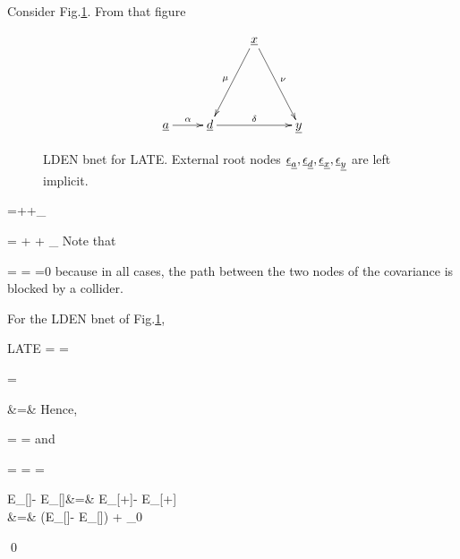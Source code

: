  Consider Fig.\ref{fig-late-lden}.
 From that figure

\begin{figure}[h!]
$$
\xymatrix{
&&\rvx\ar[ddl]_\mu
\ar[ddr]^\nu
\\
\\
\rva\ar[r]^\alp
&\rvd\ar[rr]^\delta
&&\rvy
}
$$
\caption{
LDEN bnet for LATE.
External root nodes 
$\underline{\epsilon}_{\underline{a}}, \underline{\epsilon}_{\underline{d}},
\underline{\epsilon}_{\underline{x}}, \underline{\epsilon}_{\underline{y}}$ are left implicit.}
\label{fig-late-lden}
\end{figure}

\beq
\rvd=\alp\rva +\mu\rvx +\rveps_\rvd
\eeq

\beq
\rvy = \delta \rvd + \nu\rvx + \rveps_\rvy
\eeq
Note that

\beq
\av{\rva, \rvx}=\av{\rva, \rveps_\rvd}
=
\av{\rva,\rveps_\rvy}=0
\eeq
because 
in all cases, the path
between the two nodes of the covariance 
is blocked by a collider.
\begin{claim}
For the LDEN bnet of Fig.\ref{fig-late-lden},

\beq
LATE = \delta =
\frac{\pder{\rvy}{\rva}}{\pder{\rvd}{\rva}}
\eeq
\end{claim}
\proof


\beq
\av{\rva, \rvd}=\alp
\av{\rva, \rva}
\eeq

\beqa
\av{\rva, \rvy}
&=&
\delta
\av{\rva, \rvd} 
\eeqa
Hence,

\beq
\alp=
\frac{\av{\rva, \rvd}}
{\av{\rva, \rva}}=
\pder{\rvd}{\rva}
\eeq
and

\beq
\delta=
\frac{\av{\rva,\rvy}}
{\av{\rva, \rvd}}=
\frac{\av{\rva,\rvy}}
{\av{\rva, \rva}}
\frac{\av{\rva, \rva}}{\av{\rva, \rvd}}
=
\frac{\pder{\rvy}{\rva}}{\pder{\rvd}{\rva}}
\eeq

\beqa
E_{}[\rvy]-
E_{}[\rvy]&=&
E_{}[\delta \rvd +\nu\rvx]-
E_{}[\delta \rvd +\nu\rvx]
\\
&=&
\delta(E_{}[\rvd]-
E_{}[\rvd])
+ \nu
{}_{0}
\eeqa

\qed

